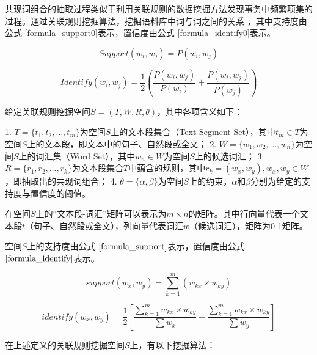 
共现词组合的抽取过程类似于利用关联规则的数据挖掘方法发现事务中频繁项集的过程。通过关联规则挖掘算法，挖掘语料库中词与词之间的关系 ，其中支持度由公式 \ref{formula_support0}表示，置信度由公式 \ref{formula_identify0}表示。

\begin{equation}
Support(w_i, w_j) = P(w_i, w_j)
\label{formula_support0}
\end{equation}

\begin{equation}
Identify(w_i, w_j) = \frac{1}{2}\left( \frac{P(w_i, w_j)}{P(w_i)} + \frac{P(w_i, w_j)}{P(w_j)} \right)
\label{formula_identify0}
\end{equation}

给定关联规则挖掘空间$S = (T, W, R, \theta)$，其中各项含义如下：

1. $T=\{t_1, t_2, \ldots, t_m\}$为空间$S$上的文本段集合（Text Segment Set），其中$t_m \in T$为空间$S$上的文本段，即文本中的句子、自然段或全文；
2. $W=\{ w_1, w_2, \ldots, w_n \}$为空间$S$上的词汇集（Word Set），其中$w_n \in W$为空间$S$上的候选词汇；
3. $R=\{ r_1, r_2, \ldots, r_k \}$为文本段集合$T$中蕴含的规则，其中$r_k=(w_x, w_y), w_x, w_y \in W$，即抽取出的共现词组合；
4. $\theta=\{ \alpha, \beta \}$为空间$S$上的约束，$\alpha$和$\beta$分别为给定的支持度与置信度的阈值。

在空间$S$上的“文本段-词汇”矩阵可以表示为$m \times n$的矩阵。其中行向量代表一个文本段$t$（句子、自然段或全文），列向量代表词汇$w$（候选词汇），矩阵为0-1矩阵。

空间$S$上的支持度由公式 $\ref{formula_support}$表示，置信度由公式 $\ref{formula_identify}$表示。

\begin{equation}
support(w_x, w_y) = \sum\limits_{k=1}^{m} (w_{kx} \times w_{ky}) 
\label{formula_support} 
\end{equation}

\begin{equation}
identify(w_x, w_y) = \frac{1}{2}\left [ 
\frac{\sum\limits_{k=1}^{m}w_{kx} \times w_{ky}}{\sum w_x} +
\frac{\sum\limits_{k=1}^{m}w_{kx} \times w_{ky}}{\sum w_y} 
\right ]
\label{formula_identify}
\end{equation}

在上述定义的关联规则挖掘空间$S$上，有以下挖掘算法：

